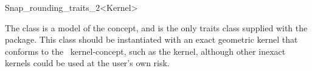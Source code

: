 
\ccRefPageBegin


\begin {ccRefClass} {Snap_rounding_traits_2<Kernel>}
    

The class  is a model of the
 concept, and is the only traits class supplied
with the package.
This class should be instantiated with an exact geometric kernel that conforms
to the \cgal\ kernel-concept, such as the
 kernel, although other inexact kernels could be
used at the user's own risk.

 
\ccIsModel
    \\
 
\end{ccRefClass} %
\ccRefPageEnd
